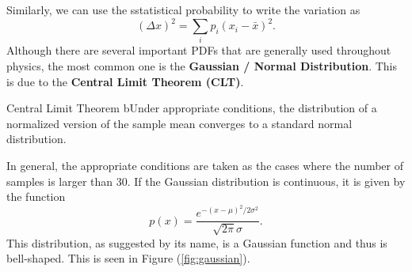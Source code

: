         Similarly, we can use the sstatistical probability to write the variation as 
        \begin{equation}
            (\Delta x)^2 = \sum_ip_i(x_i-\bar{x})^2.
            \label{eq:stddevdefn}
        \end{equation}
        Although there are several important PDFs that are generally used throughout physics, the most common one is the \textbf{Gaussian / Normal Distribution}. This is due to the \textbf{Central Limit Theorem (CLT)}.
        \begin{theorem}{Central Limit Theorem}
            bUnder appropriate conditions, the distribution of a normalized version of the sample mean converges to a standard normal distribution.
        \end{theorem}
        In general, the appropriate conditions are taken as the cases where the number of samples is larger than 30. If the Gaussian distribution is continuous, it is given by the function
        \begin{equation}
            p(x) = \frac{e^{-(x-\mu)^2/2\sigma^2}}{\sqrt{2\pi}\sigma}.
            \label{eq:gaussian}
        \end{equation}
        This distribution, as suggested by its name, is a Gaussian function and thus is bell-shaped. This is seen in Figure (\ref{fig:gaussian}).
